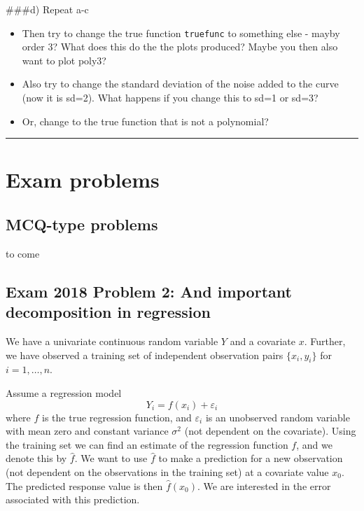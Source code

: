 \documentclass[]{article}
\providecommand{\tightlist}{%
  \setlength{\itemsep}{0pt}\setlength{\parskip}{0pt}}
\begin{document}
\#\#\#d) Repeat a-c

\begin{itemize}
\tightlist
\item
  Then try to change the true function \texttt{truefunc} to something
  else - mayby order 3? What does this do the the plots produced? Maybe
  you then also want to plot poly3?
\item
  Also try to change the standard deviation of the noise added to the
  curve (now it is sd=2). What happens if you change this to sd=1 or
  sd=3?
\item
  Or, change to the true function that is not a polynomial?
\end{itemize}

\begin{center}\rule{0.5\linewidth}{\linethickness}\end{center}

\hypertarget{exam-problems}{%
\section{Exam problems}\label{exam-problems}}

\hypertarget{mcq-type-problems}{%
\subsection{MCQ-type problems}\label{mcq-type-problems}}

to come

\hypertarget{exam-2018-problem-2-and-important-decomposition-in-regression}{%
\subsection{Exam 2018 Problem 2: And important decomposition in
regression}\label{exam-2018-problem-2-and-important-decomposition-in-regression}}

We have a univariate continuous random variable \(Y\) and a covariate
\(x\). Further, we have observed a training set of independent
observation pairs \(\{x_i, y_i\}\) for \(i=1,\ldots,n\).

Assume a regression model \[Y_i  = f(x_i) + \varepsilon_i\] where \(f\)
is the true regression function, and \(\varepsilon_i\) is an unobserved
random variable with mean zero and constant variance \(\sigma^2\) (not
dependent on the covariate). Using the training set we can find an
estimate of the regression function \(f\), and we denote this by
\(\hat{f}\). We want to use \(\hat{f}\) to make a prediction for a new
observation (not dependent on the observations in the training set) at a
covariate value \(x_0\). The predicted response value is then
\(\hat{f}(x_0)\). We are interested in the error associated with this
prediction.
\end{document}
